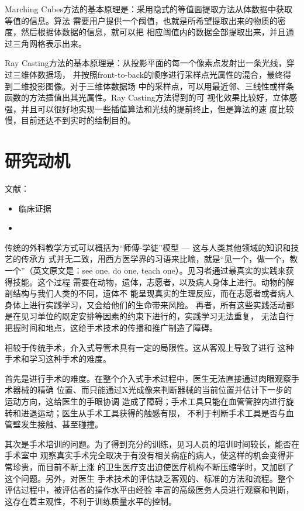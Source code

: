 Marching Cubes方法的基本原理是：采用隐式的等值面提取方法从体数据中获取等值的信息。算法
需要用户提供一个阈值，也就是所希望提取出来的物质的密度，然后根据体数据的信息，就可以把
相应阈值内的数据全部提取出来，并且通过三角网格表示出来。

Ray Casting方法的基本原理是：从投影平面的每一个像素点发射出一条光线，穿过三维体数据场，
并按照front-to-back的顺序进行采样点光属性的混合，最终得到二维投影图像。对于三维体数据场
中的采样点，可以用最近邻、三线性或样条函数的方法插值出其光属性。Ray Casting方法得到的可
视化效果比较好，立体感强，并且可以很好地实现一些插值算法和光线的提前终止，但是算法的速
度比较慢，目前还达不到实时的绘制目的。

\section{研究动机}
\label{sec1-2}

文献：
\begin{itemize}
  \item 临床证据\cite{Aggarwal2006}
  \item
\end{itemize}

传统的外科教学方式可以概括为“师傅-学徒”模型 --- 这与人类其他领域的知识和技艺的传承方
式并无二致，用西方医学界的习语来比喻，就是“见一个，做一个，教一个”（英文原文是：see
one, do one, teach one）\cite{Dawson1998}。见习者通过最真实的实践来获得技能。这个过程
需要在动物，遗体，志愿者，以及病人身体上进行。动物的解剖结构与我们人类的不同，遗体不
能呈现真实的生理反应，而在志愿者或者病人身体上进行实践学习，又会给他们的生命带来风险\cite{liu2003}。
再者，所有这些实践活动都是在见习单位的既定安排等因素的约束下进行的，实践学习无法重复，
无法自行把握时间和地点，这给手术技术的传播和推广制造了障碍。

相较于传统手术，介入式导管术具有一定的局限性\cite{basdogan2007}。这从客观上导致了进行
这种手术和学习这种手术的难度。

首先是进行手术的难度。在整个介入式手术过程中，医生无法直接通过肉眼观察手术器械的精确
位置、而只能通过X光成像来判断器械的当前位置并估计下一步的运动方向，这给医生的手眼协调
造成了障碍；手术工具只能在血管管腔内进行旋转和进退运动；医生从手术工具获得的触感有限，
不利于判断手术工具是否与血管壁发生接触、甚至碰撞。

其次是手术培训的问题。为了得到充分的训练，见习人员的培训时间较长，能否在手术室中
观察真实手术完全取决于有没有相关病症的病人，使这样的机会变得非常珍贵，而目前不断上涨
的卫生医疗支出迫使医疗机构不断压缩学时，又加剧了这个问题\cite{liu2003}。另外，对医生
手术技术的评估缺乏客观的、标准的方法和流程。整个评估过程中，被评估者的操作水平由经验
丰富的高级医务人员进行观察和判断，这存在着主观性，不利于训练质量水平的控制\cite{basdogan2007}。

